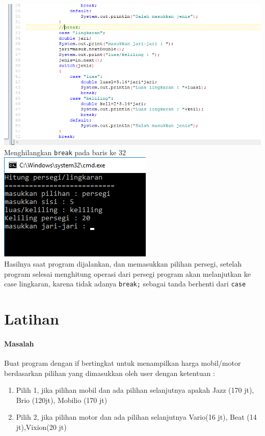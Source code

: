 \documentclass[a4paper,12pt]{article}
\begin{document}
\includegraphics[width=\linewidth]{image--013}\\
Menghilangkan \texttt{break} pada baris ke 32\\
\includegraphics[scale=.6]{image--014}\\
Hasilnya saat program dijalankan, dan memasukkan pilihan persegi, setelah program selesai menghitung operasi dari persegi program akan melanjutkan ke case lingkaran, karena tidak adanya \texttt{break;} sebagai tanda berhenti dari \texttt{case}

\section{Latihan}
\paragraph{Masalah\\}
Buat program dengan if bertingkat untuk menampilkan harga mobil/motor
berdasarkan pilihan yang dimasukkan oleh user dengan ketentuan :
\begin{enumerate}[label=\alph*.]
	\item Pilih 1, jika pilihan mobil dan ada pilihan selanjutnya apakah Jazz (170 jt), Brio (120jt), Mobilio (170 jt)
	\item Pilih 2, jika pilihan motor dan ada pilihan selanjutnya Vario(16 jt), Beat (14 jt),Vixion(20 jt)
\end{enumerate}
\end{document}
